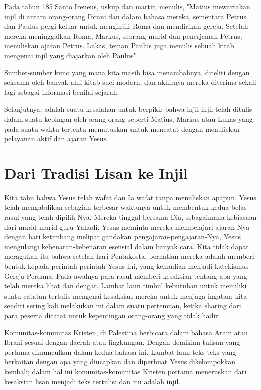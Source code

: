 Pada tahun 185 Santo Ireneus, uskup dan martir, menulis, "Matius mewartakan injil di antara orang-orang Ibrani dan dalam bahasa mereka, sementara Petrus dan Paulus pergi keluar untuk menginjili Roma dan mendirikan gereja. Setelah mereka meninggalkan Roma, Markus, seorang murid dan penerjemah Petrus, menuliskan ajaran Petrus. Lukas, teman Paulus juga menulis sebuah kitab mengenai injil yang diajarkan oleh Paulus".

Sumber-sumber kuno yang mana kita masih bisa menambahnya, diteliti dengan seksama oleh banyak ahli kitab suci modern, dan akhirnya mereka diterima sekali lagi sebagai informasi benilai sejarah.

Selanjutnya, adalah suatu kesalahan untuk berpikir bahwa injil-injil telah ditulis dalam suatu kepingan oleh orang-orang seperti Matius, Markus atau Lukas yang pada suatu waktu tertentu memutuskan untuk mencatat dengan menuliskan pelayanan aktif dan ajaran Yesus.

\section*{Dari Tradisi Lisan ke Injil}
Kita tahu bahwa Yesus telah wafat dan Ia wafat tanpa menuliskan apapun. Yesus telah mengabdikan sebagian terbesar waktunya untuk membentuk kedua belas rasul yang telah dipilih-Nya. Mereka tinggal bersama Dia, sebagaimana kebiasaan dari murid-murid guru Yahudi. Yesus meminta mereka mempelajari ajaran-Nya dengan hati ketimbang melipat gandakan pengajaran-pengajaran-Nya, Yesus mengulangi kebenaran-kebenaran esensial dalam banyak cara. Kita tidak dapat meragukan itu bahwa setelah hari Pentakosta, perhatian mereka adalah memberi bentuk kepada perintah-perintah Yesus ini, yang kemudian menjadi katekismus Gereja Perdana. Pada awalnya para rasul memberi kesaksian tentang apa yang telah mereka lihat dan dengar. Lambat laun timbul kebutuhan untuk memiliki suatu catatan tertulis mengenai kesaksian mereka untuk menjaga ingatan: kita sendiri sering kali melakukan ini dalam suatu pertemuan, ketika sharing dari para peserta dicatat untuk kepentingan orang-orang yang tidak hadir.

Komunitas-komunitas Kristen, di Palestina berbicara dalam bahasa Aram atau Ibrani sesuai dengan daerah atau lingkungan. Dengan demikian tulisan yang pertama dimunculkan dalam kedua bahasa ini. Lambat laun teks-teks yang berkaitan dengan apa yang diucapkan dan diperbuat Yesus dikelompokkan kembali; dalam hal ini komunitas-komunitas Kristen pertama meneruskan dari kesaksian lisan menjadi teks tertulis: dan itu adalah injil.

